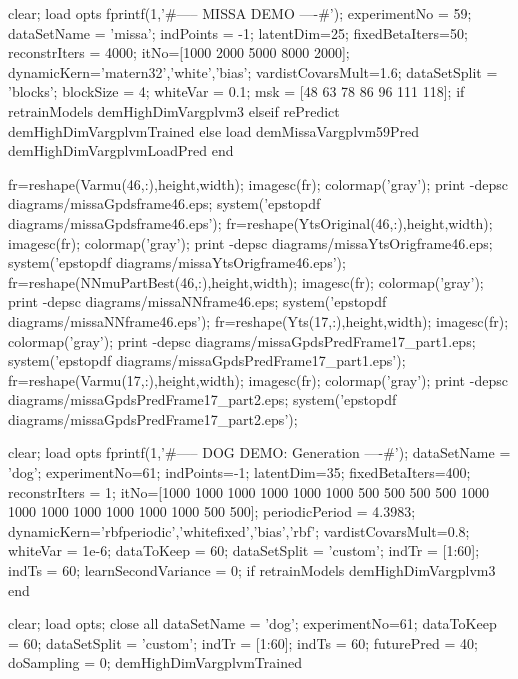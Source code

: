 \documentclass{article} %
\newenvironment{matlab}{\comment}{\endcomment}
\begin{document}
\begin{matlab}
clear; load opts
fprintf(1,'\n\n#-----  MISSA DEMO ----#\n');
experimentNo = 59;
dataSetName = 'missa';
indPoints = -1; latentDim=25;
fixedBetaIters=50; reconstrIters = 4000;
itNo=[1000 2000 5000 8000 2000]; %
dynamicKern={'matern32','white','bias'};
vardistCovarsMult=1.6;
dataSetSplit = 'blocks';
blockSize = 4; whiteVar = 0.1;
msk = [48 63 78 86 96 111 118];
if retrainModels
    demHighDimVargplvm3
elseif rePredict
    demHighDimVargplvmTrained
else
    load demMissaVargplvm59Pred
    demHighDimVargplvmLoadPred
end

fr=reshape(Varmu(46,:),height,width); imagesc(fr); colormap('gray'); %
print -depsc diagrams/missaGpdsframe46.eps; system('epstopdf diagrams/missaGpdsframe46.eps');
fr=reshape(YtsOriginal(46,:),height,width); imagesc(fr); colormap('gray'); %
print -depsc diagrams/missaYtsOrigframe46.eps; system('epstopdf diagrams/missaYtsOrigframe46.eps');
fr=reshape(NNmuPartBest(46,:),height,width); imagesc(fr); colormap('gray'); %
print -depsc diagrams/missaNNframe46.eps; system('epstopdf diagrams/missaNNframe46.eps');
fr=reshape(Yts(17,:),height,width); imagesc(fr); colormap('gray'); 
print -depsc diagrams/missaGpdsPredFrame17_part1.eps; system('epstopdf diagrams/missaGpdsPredFrame17_part1.eps');
fr=reshape(Varmu(17,:),height,width); imagesc(fr); colormap('gray');
print -depsc diagrams/missaGpdsPredFrame17_part2.eps; system('epstopdf diagrams/missaGpdsPredFrame17_part2.eps');



clear; load opts
fprintf(1,'\n\n#-----  DOG DEMO: Generation ----#\n');
dataSetName = 'dog';
experimentNo=61;
indPoints=-1; latentDim=35;
fixedBetaIters=400;
reconstrIters = 1; %
itNo=[1000 1000 1000 1000 1000 1000 500 500 500 500 1000 1000 1000 1000 1000 1000 1000 500 500]; %
periodicPeriod = 4.3983; %
dynamicKern={'rbfperiodic','whitefixed','bias','rbf'};
vardistCovarsMult=0.8;
whiteVar = 1e-6;
dataToKeep = 60; dataSetSplit = 'custom';
indTr = [1:60];
indTs = 60; %
learnSecondVariance = 0;
if retrainModels
    demHighDimVargplvm3
end

clear; load opts; close all 
dataSetName = 'dog'; 
experimentNo=61; dataToKeep = 60; dataSetSplit = 'custom';
indTr = [1:60]; indTs = 60;
futurePred = 40; doSampling = 0; demHighDimVargplvmTrained


\end{matlab}
\end{document}
